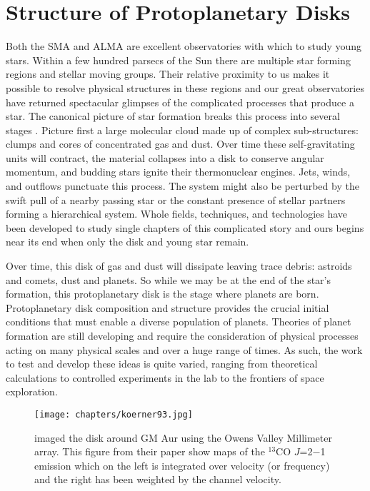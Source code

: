 \section{Structure of Protoplanetary Disks}

Both the SMA and ALMA are excellent observatories with which to study young stars.  Within a few hundred parsecs 
of the Sun there are multiple star forming regions and stellar moving groups.  Their relative proximity to us 
makes it possible to resolve physical structures in these regions and our great observatories have returned 
spectacular glimpses of the complicated processes that produce a star.  The canonical picture of star formation 
breaks this process into several stages \citep{shu87,mckee07}.  Picture first a large 
molecular cloud made up of complex sub-structures: clumps and cores of 
concentrated gas and dust.  Over time these self-gravitating units will contract,  the material collapses into 
a disk to conserve angular momentum, and budding stars ignite their thermonuclear engines.  Jets, winds, and 
outflows punctuate this process.  The system might also be perturbed by the swift pull of a nearby passing star 
or the constant presence of stellar partners forming a hierarchical system.  Whole fields, techniques, and 
technologies have been developed to study single chapters of this 
complicated story and ours begins near its end when only the disk and young star remain.

Over time, this disk of gas and dust will dissipate leaving trace debris: astroids and comets, dust and planets.
So while we may be at the end of the star's formation, this protoplanetary disk is the stage where planets are
born.  Protoplanetary disk composition and structure provides the crucial initial conditions that must 
enable a diverse 
population of planets.  Theories of planet formation are still developing and require the consideration 
of physical processes acting on many physical scales and over a huge range of times.  As such, the
work to test and develop these ideas is quite varied, ranging from theoretical calculations to controlled 
experiments in the lab to the frontiers of space exploration.

\begin{figure}[t]
\vspace{4cm}
\texttt{[image: chapters/koerner93.jpg]}
\caption{\citet{koerner93} imaged the disk around GM Aur using the Owens Valley Millimeter array. This figure
from their paper 
show maps of the $^{13}$CO $J$=2$-$1 emission which on the left is integrated over velocity (or frequency) and 
the right has been weighted by the channel velocity.}
\end{figure}

